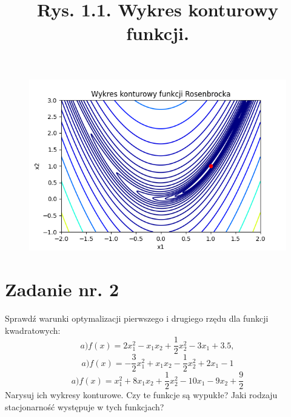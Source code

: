 \documentclass{article}
\begin{document}
\begin{figure}[h]
  \includegraphics[scale=0.8]{zad1.png}
  \title{Rys. 1.1. Wykres konturowy funkcji.}
  \centering
\end{figure}

\section{Zadanie nr. 2}
Sprawdź warunki optymalizacji pierwszego i drugiego rzędu dla funkcji kwadratowych:
\begin{equation}
  a) f(x) = 2x^2_1 - x_1x_2 + \frac{1}{2}x^2_2 - 3x_1 + 3.5,
\end{equation}
\begin{equation}
  a) f(x) = -\frac{3}{2}x^2_1+x_1x_2-\frac{1}{2}x^2_2 +2x_1 - 1
\end{equation}
\begin{equation}
  a) f(x) = x^2_1 + 8x_1x_2 + \frac{1}{2} x^2_2 - 10x_1 - 9x_2 + \frac{9}{2}
\end{equation}
Narysuj ich wykresy konturowe. Czy te funkcje są wypukłe? Jaki rodzaju stacjonarność
występuje w tych funkcjach?\newline
\end{document}
